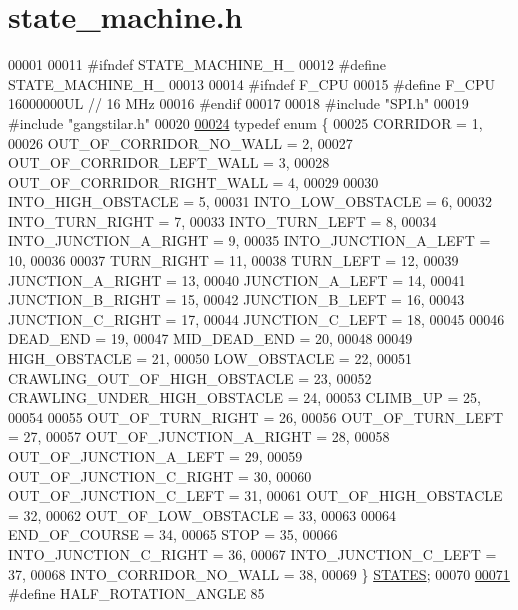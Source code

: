 \hypertarget{state__machine_8h_source}{}\section{state\+\_\+machine.\+h}
\label{state__machine_8h_source}

\begin{DoxyCode}
00001 
00011 \textcolor{preprocessor}{#ifndef STATE\_MACHINE\_H\_}
00012 \textcolor{preprocessor}{#define STATE\_MACHINE\_H\_}
00013 
00014 \textcolor{preprocessor}{#ifndef F\_CPU}
00015 \textcolor{preprocessor}{#define F\_CPU 16000000UL        // 16 MHz}
00016 \textcolor{preprocessor}{#endif}
00017 
00018 \textcolor{preprocessor}{#include "SPI.h"}
00019 \textcolor{preprocessor}{#include "gangstilar.h"}
00020 
\hypertarget{state__machine_8h_source.tex_l00024}{}\hyperlink{state__machine_8h_a94b1da2e055fff4d143aa6aa891f79a9}{00024} \textcolor{keyword}{typedef} \textcolor{keyword}{enum} \{
00025     CORRIDOR = 1, 
00026     OUT\_OF\_CORRIDOR\_NO\_WALL = 2, 
00027     OUT\_OF\_CORRIDOR\_LEFT\_WALL = 3, 
00028     OUT\_OF\_CORRIDOR\_RIGHT\_WALL = 4,
00029     
00030     INTO\_HIGH\_OBSTACLE = 5, 
00031     INTO\_LOW\_OBSTACLE = 6, 
00032     INTO\_TURN\_RIGHT = 7,  
00033     INTO\_TURN\_LEFT = 8, 
00034     INTO\_JUNCTION\_A\_RIGHT = 9, 
00035     INTO\_JUNCTION\_A\_LEFT = 10,
00036     
00037     TURN\_RIGHT = 11, 
00038     TURN\_LEFT = 12, 
00039     JUNCTION\_A\_RIGHT = 13, 
00040     JUNCTION\_A\_LEFT = 14, 
00041     JUNCTION\_B\_RIGHT = 15, 
00042     JUNCTION\_B\_LEFT = 16, 
00043     JUNCTION\_C\_RIGHT = 17, 
00044     JUNCTION\_C\_LEFT = 18, 
00045     
00046     DEAD\_END = 19,
00047     MID\_DEAD\_END = 20,
00048     
00049     HIGH\_OBSTACLE = 21, 
00050     LOW\_OBSTACLE = 22, 
00051     CRAWLING\_OUT\_OF\_HIGH\_OBSTACLE = 23, 
00052     CRAWLING\_UNDER\_HIGH\_OBSTACLE = 24, 
00053     CLIMB\_UP = 25,
00054     
00055     OUT\_OF\_TURN\_RIGHT = 26, 
00056     OUT\_OF\_TURN\_LEFT = 27, 
00057     OUT\_OF\_JUNCTION\_A\_RIGHT = 28, 
00058     OUT\_OF\_JUNCTION\_A\_LEFT = 29, 
00059     OUT\_OF\_JUNCTION\_C\_RIGHT = 30, 
00060     OUT\_OF\_JUNCTION\_C\_LEFT = 31, 
00061     OUT\_OF\_HIGH\_OBSTACLE = 32, 
00062     OUT\_OF\_LOW\_OBSTACLE = 33,
00063     
00064     END\_OF\_COURSE = 34, 
00065     STOP = 35,
00066     INTO\_JUNCTION\_C\_RIGHT = 36,
00067     INTO\_JUNCTION\_C\_LEFT = 37,
00068     INTO\_CORRIDOR\_NO\_WALL = 38,
00069 \} \hyperlink{state__machine_8h_a94b1da2e055fff4d143aa6aa891f79a9}{STATES};
00070 
\hypertarget{state__machine_8h_source.tex_l00071}{}\hyperlink{state__machine_8h_a5776a711f0156180fe5efb79c9ffc24f}{00071} \textcolor{preprocessor}{#define HALF\_ROTATION\_ANGLE 85          }

\end{DoxyCode}
